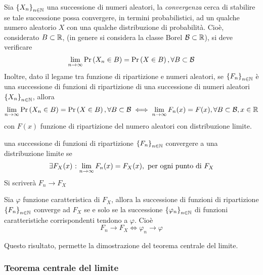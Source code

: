 \documentclass{subfiles}
\begin{document}
Sia \(\Sequence{X_{n}}\) una successione di numeri aleatori,
la \emph{convergenza} cerca di stabilire se tale successione possa convergere, in termini probabilistici,
ad un qualche numero aleatorio \(X\) con una qualche distribuzione di probabilità.
Cioè, considerato \(B \subset \operatorname{\mathbb{R}}\), (in genere si considera la classe Borel \(\operatorname{\mathcal{B}} \subset \operatorname{\mathbb{R}}\)), si deve verificare
\[
    \Lim{n}{\infty}{\Prob{X_{n} \in B}} = \Prob{X \in B}, \forall B \subset \Borel
\]
Inoltre, dato il legame tra funzione di ripartizione e numeri aleatori,
se \(\Sequence{F_{n}}\) è una successione di funzioni di ripartizione di una successione di numeri aleatori \(\Sequence{X_{n}}\), allora
\[
    \Lim{n}{\infty}{\Prob{X_{n} \in B}} = \Prob{X \in B}, \forall B \subset \Borel   \iff \Lim{n}{\infty}{F_{n}(x)} = F(x), \forall B \subset \Borel, x \in \Real
\]
con \(F(x)\) funzione di ripartizione del numero aleatori con distribuzione limite.
\begin{Definition*}
    una successione di funzioni di ripartizione \(\Sequence{F_{n}}\) convergere a una distribuzione limite se
    \[
        \exists F_{X}(x) \Such \Lim{n}{\infty}{F_{n}(x)} = F_{X}(x), \text{per ogni punto di} F_{X}
    \]
    Si scriverà \(F_{n} \to F_{X}\)
\end{Definition*}

\begin{Theorem*}
    Sia \(\varphi\) funzione caratteristica di \(F_{X}\), allora la successione di funzioni di ripartizione \(\Sequence{F_{n}}\) converge ad \(F_{X}\)
    se e solo se la successione \(\Sequence{\varphi_{n}}\) di funzioni caratteristiche corrispondenti tendono a \(\varphi\). Cioè
    \[
        F_{n} \to F_{X} \iff \varphi_{n} \to \varphi
    \]
\end{Theorem*}
\begin{Note*}
    Questo risultato, permette la dimostrazione del teorema centrale del limite.
\end{Note*}
\clearpage

\subsubsection{Teorema centrale del limite}

\end{document}
